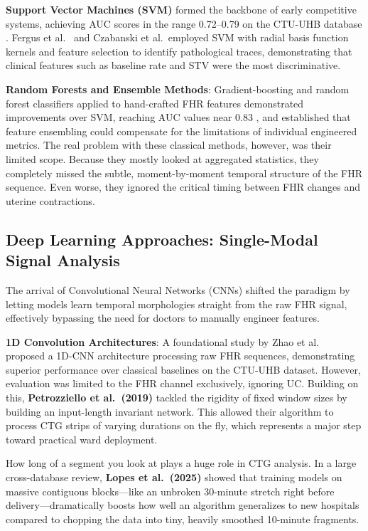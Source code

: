 \documentclass[conference]{IEEEtran}
\begin{document}
\textbf{Support Vector Machines (SVM)} formed the backbone of early competitive
systems, achieving AUC scores in the range 0.72–0.79 on the CTU-UHB database
\cite{spilka2012}. Fergus et al.\ \cite{fergus2013} and Czabanski et
al.\ employed SVM with radial basis function kernels and feature selection to
identify pathological traces, demonstrating that clinical features such as
baseline rate and STV were the most discriminative.

\textbf{Random Forests and Ensemble Methods}: Gradient-boosting and
random forest classifiers applied to hand-crafted FHR features demonstrated
improvements over SVM, reaching AUC values near 0.83 \cite{krupa2011}, and
established that feature ensembling could compensate for the limitations of
individual engineered metrics. The real problem with these classical methods, however, was their limited scope. Because they mostly looked at aggregated statistics, they completely missed the subtle, moment-by-moment temporal structure of the FHR sequence. Even worse, they ignored the critical timing between FHR changes and uterine contractions.

\subsection{Deep Learning Approaches: Single-Modal Signal Analysis}

The arrival of Convolutional Neural Networks (CNNs) shifted the paradigm by letting models learn temporal morphologies straight from the raw FHR signal, effectively bypassing the need for doctors to manually engineer features.

\textbf{1D Convolution Architectures}: A foundational study by Zhao et al.\ \cite{zhao2019}
proposed a 1D-CNN architecture processing raw FHR sequences, demonstrating
superior performance over classical baselines on the CTU-UHB dataset.
However, evaluation was limited to the FHR channel exclusively, ignoring UC.
Building on this, \textbf{Petrozziello et al.\ (2019)} \cite{petrozziello2019}
tackled the rigidity of fixed window sizes by building an input-length invariant network. This allowed their algorithm to process CTG strips of varying durations on the fly, which represents a major step toward practical ward deployment.

How long of a segment you look at plays a huge role in CTG analysis. In a large cross-database review, \textbf{Lopes et al.\ (2025)} \cite{lopes2025} showed that training models on massive contiguous blocks—like an unbroken 30-minute stretch right before delivery—dramatically boosts how well an algorithm generalizes to new hospitals compared to chopping the data into tiny, heavily smoothed 10-minute fragments.
\end{document}
